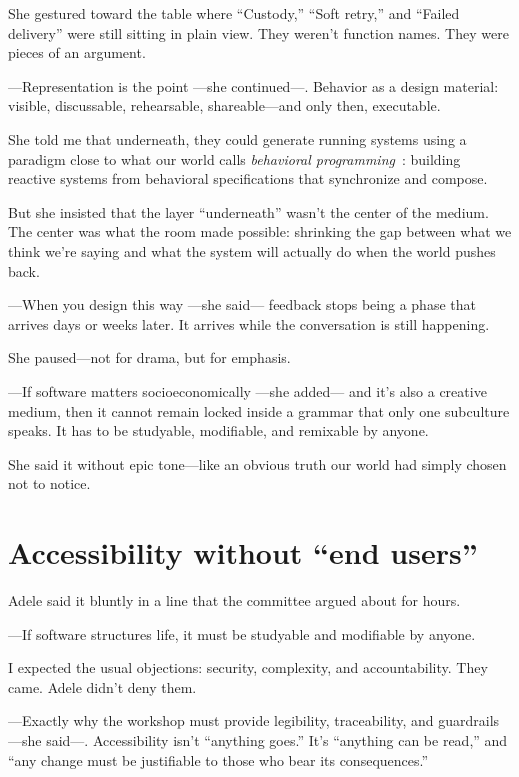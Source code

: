 \documentclass[11pt,a4paper]{article}
\begin{document}
She gestured toward the table where ``Custody,'' ``Soft retry,'' and ``Failed
delivery'' were still sitting in plain view. They weren't function names.
They were pieces of an argument.

---Representation is the point ---she continued---. Behavior as a design
material: visible, discussable, rehearsable, shareable---and only then,
executable.

She told me that underneath, they could generate running systems using a
paradigm close to what our world calls \emph{behavioral
programming}~\cite{harel}: building reactive systems from behavioral
specifications that synchronize and compose.

But she insisted that the layer ``underneath'' wasn't the center of the
medium. The center was what the room made possible: shrinking the gap between
what we think we're saying and what the system will actually do when the
world pushes back.

---When you design this way ---she said--- feedback stops being a phase that
arrives days or weeks later. It arrives while the conversation is still
happening.

She paused---not for drama, but for emphasis.

---If software matters socioeconomically ---she added--- and it's also a
creative medium, then it cannot remain locked inside a grammar that only one
subculture speaks. It has to be studyable, modifiable, and remixable by
anyone.

She said it without epic tone---like an obvious truth our world had simply
chosen not to notice.

\section{Accessibility without ``end users''}

Adele said it bluntly in a line that the committee argued about for hours.

---If software structures life, it must be studyable and modifiable by
anyone.

I expected the usual objections: security, complexity, and accountability.
They came. Adele didn't deny them.

---Exactly why the workshop must provide legibility, traceability, and
guardrails ---she said---. Accessibility isn't ``anything goes.'' It's
``anything can be read,'' and ``any change must be justifiable to those who
bear its consequences.''
\end{document}
